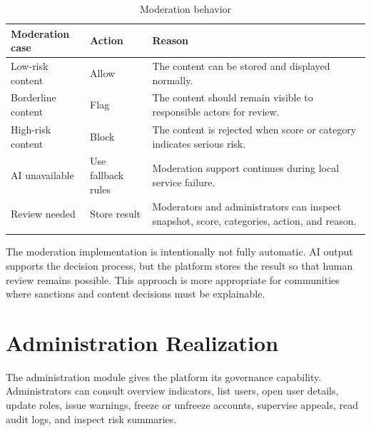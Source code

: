 \begin{longtable}{|m{3.3cm}|m{4.8cm}|m{5.7cm}|}
\hline
\textbf{Moderation case} & \textbf{Action} & \textbf{Reason} \\
\hline
Low-risk content & Allow & The content can be stored and displayed normally. \\
\hline
Borderline content & Flag & The content should remain visible to responsible actors for review. \\
\hline
High-risk content & Block & The content is rejected when score or category indicates serious risk. \\
\hline
AI unavailable & Use fallback rules & Moderation support continues during local service failure. \\
\hline
Review needed & Store result & Moderators and administrators can inspect snapshot, score, categories, action, and reason. \\
\hline
\caption{Moderation behavior}
\end{longtable}

The moderation implementation is intentionally not fully automatic. AI output supports the decision process, but the platform stores the result so that human review remains possible. This approach is more appropriate for communities where sanctions and content decisions must be explainable.

\section{Administration Realization}

The administration module gives the platform its governance capability. Administrators can consult overview indicators, list users, open user details, update roles, issue warnings, freeze or unfreeze accounts, supervise appeals, read audit logs, and inspect risk summaries.

